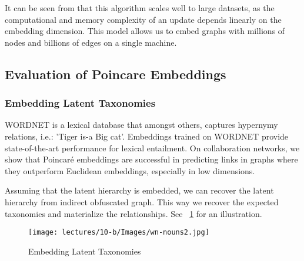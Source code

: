 It can be seen from that this algorithm scales well to large datasets, as the computational and memory complexity of an update depends linearly on the embedding dimension. This model allows us to embed graphs with millions of nodes and billions of edges on a single machine.

\subsection{Evaluation of Poincare Embeddings}
\subsubsection{Embedding Latent Taxonomies}

WORDNET is a lexical database that amongst others, captures hypernymy relations, i.e.: 'Tiger is-a Big cat'. Embeddings trained on WORDNET provide state-of-the-art performance for lexical entailment. On collaboration networks, we show that Poincaré embeddings are successful in predicting links in graphs where they outperform Euclidean embeddings, especially in low dimensions.  

Assuming that the latent hierarchy is embedded, we can recover the latent hierarchy from indirect obfuscated graph. This way we recover the expected taxonomies and materialize the relationships. See ~\ref{fig:wn-nouns} for an illustration.
\begin{figure}[htb]
  \centering
    \texttt{[image: lectures/10-b/Images/wn-nouns2.jpg]}
    \caption{Embedding Latent Taxonomies}
    \label{fig:wn-nouns}
\end{figure}

